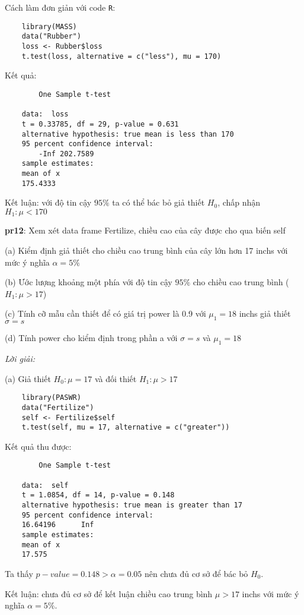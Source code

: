 Cách làm đơn giản với code \lstinline{R}:
\begin{lstlisting}
    library(MASS)
    data("Rubber")
    loss <- Rubber$loss
    t.test(loss, alternative = c("less"), mu = 170)
\end{lstlisting}
Kết quả:
\begin{lstlisting}
        One Sample t-test

    data:  loss
    t = 0.33785, df = 29, p-value = 0.631
    alternative hypothesis: true mean is less than 170
    95 percent confidence interval:
        -Inf 202.7589
    sample estimates:
    mean of x 
    175.4333 
\end{lstlisting}
Kết luận: với độ tin cậy $95\%$ ta có thể bác bỏ giả thiết $H_0$, chấp nhận $H_1: \mu < 170$

\textbf{pr12}: Xem xét data frame Fertilize, chiều cao của cây được cho qua biến self

(a) Kiểm định giả thiết cho chiều cao trung bình của cây lớn hơn 17 inchs với mức ý nghĩa $\alpha = 5\%$

(b) Ước lượng khoảng một phía với độ tin cậy $95\%$ cho chiều cao trung bình ($H_1: \mu > 17$)

(c) Tính cỡ mẫu cần thiết để có giá trị power là 0.9 với $\mu_1 = 18$ inchs giả thiết $\sigma = s$

(d) Tính power cho kiểm định trong phần a với $\sigma = s$ và $\mu_1 = 18$

\textit{Lời giải:}

(a) Giả thiết $H_0: \mu = 17$ và đối thiết $H_1: \mu > 17$

\begin{lstlisting}
    library(PASWR)
    data("Fertilize")
    self <- Fertilize$self
    t.test(self, mu = 17, alternative = c("greater"))
\end{lstlisting}

Kết quả thu được:

\begin{lstlisting}
        One Sample t-test

    data:  self
    t = 1.0854, df = 14, p-value = 0.148
    alternative hypothesis: true mean is greater than 17
    95 percent confidence interval:
    16.64196      Inf
    sample estimates:
    mean of x 
    17.575 
\end{lstlisting}
Ta thấy $p-value = 0.148 > \alpha = 0.05$ nên chưa đủ cơ sở để bác bỏ $H_0$.

Kết luận: chưa đủ cơ sở để kết luận chiều cao trung bình $\mu > 17$ inchs với 
mức ý nghĩa $\alpha = 5\%$.

